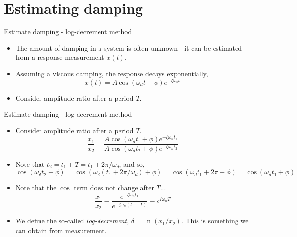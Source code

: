 \documentclass[11pt,aspectratio=169,handout]{beamer}
\begin{document}
\section{Estimating damping}

\begin{frame}[c]{Estimate damping - log-decrement method}
	\begin{itemize}
		\item<1-> The amount of damping in a system is often unknown - it can be estimated from a response measurement $x(t)$. 
		\item Assuming a viscous damping, the response decays exponentially,
		\begin{equation}
			x(t) = A\cos(\omega_d t + \phi) e^{-\zeta\omega_n t} 
		\end{equation}
	\item<2-> Consider amplitude ratio after a period $T$.
	\end{itemize}
\vspace{0.25cm}
	\begin{figure}
	
\end{figure}
\end{frame}

\begin{frame}[c]{Estimate damping - log-decrement method}
	\begin{itemize}
		\item<1-> Consider amplitude ratio after a period $T$.
		\begin{equation}
			\frac{x_1}{x_2} = \frac{A\cos(\omega_d t_1 + \phi) e^{-\zeta\omega_n t_1} }{A\cos(\omega_d t_2 + \phi) e^{-\zeta\omega_n t_2} }
		\end{equation}
	\item<2-> Note that $t_2 = t_1 + T = t_1 + 2\pi/\omega_d$, and so, 
	\begin{equation}
		\cos(\omega_d t_2 + \phi) = \cos(\omega_d (t_1 + 2\pi/\omega_d) + \phi) = \cos(\omega_d t_1 + 2\pi + \phi) = \cos(\omega_d t_1 + \phi)
	\end{equation}
	\item<3-> Note that the $\cos$ term does not change after $T$...
		\begin{equation}
		\frac{x_1}{x_2} = \frac{e^{-\zeta\omega_n t_1} }{e^{-\zeta\omega_n (t_1+T)} } = e^{\zeta\omega_n T}
	\end{equation}
	\item<4-> We define the so-called \textit{log-decrement}, $\delta = \ln(x_1/x_2)$. This is something we can obtain from measurement.
	\end{itemize}
\end{frame}
\end{document}

